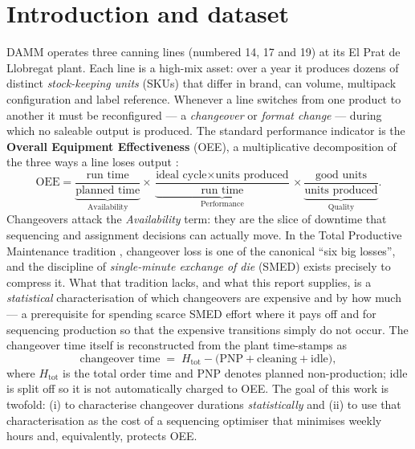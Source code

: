 \documentclass[11pt,a4paper]{article}
\begin{document}
\section{Introduction and dataset}\label{sec:intro}
DAMM operates three canning lines (numbered 14, 17 and 19) at its El Prat de
Llobregat plant. Each line is a high-mix asset: over a year it produces dozens of
distinct \emph{stock-keeping units} (SKUs) that differ in brand, can volume,
multipack configuration and label reference. Whenever a line switches from one
product to another it must be reconfigured --- a \emph{changeover} or
\emph{format change} --- during which no saleable output is produced. The standard
performance indicator is the \textbf{Overall Equipment Effectiveness} (OEE), a
multiplicative decomposition of the three ways a line loses output
\cite{nakajima1988tpm}:
\begin{equation}
\text{OEE} = \underbrace{\frac{\text{run time}}{\text{planned time}}}_{\text{Availability}}
           \times
           \underbrace{\frac{\text{ideal cycle}\times\text{units produced}}{\text{run time}}}_{\text{Performance}}
           \times
           \underbrace{\frac{\text{good units}}{\text{units produced}}}_{\text{Quality}} .
\label{eq:oee}
\end{equation}
Changeovers attack the \emph{Availability} term: they are the slice of downtime
that sequencing and assignment decisions can actually move. In the Total
Productive Maintenance tradition \cite{nakajima1988tpm}, changeover loss is one of
the canonical ``six big losses'', and the discipline of \emph{single-minute
exchange of die} (SMED) \cite{shingo1985smed} exists precisely to compress it.
What that tradition lacks, and what this report supplies, is a \emph{statistical}
characterisation of which changeovers are expensive and by how much --- a
prerequisite for spending scarce SMED effort where it pays off and for sequencing
production so that the expensive transitions simply do not occur. The changeover time
itself is reconstructed from the plant time-stamps as
\begin{equation}
\text{changeover time} \;=\; H_{\text{tot}} - \big(\text{PNP}+\text{cleaning}+\text{idle}\big),
\label{eq:cotime}
\end{equation}
where $H_{\text{tot}}$ is the total order time and PNP denotes planned
non-production; idle is split off so it is not automatically charged to OEE. The
goal of this work is twofold: (i) to characterise changeover durations
\emph{statistically} and (ii) to use that characterisation as the cost of a
sequencing optimiser that minimises weekly hours and, equivalently, protects OEE.
\end{document}
